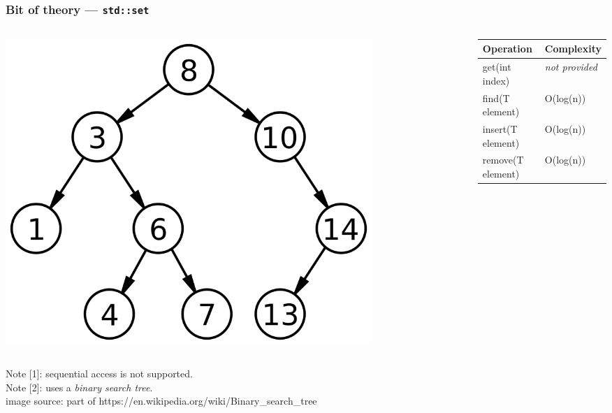 \documentclass[aspectratio=169]{beamer}
\newcommand{\greenemph}[1]{\textit{\textcolor{clGreen}{#1}}}
\newcommand{\cpp}[1]{\texttt{\textbf{\textcolor{clCodeBlue}{#1}}}}
\newcommand\fontV{\fontsize{5}{5}\selectfont}
\newcommand\addsource[1]{\fontV\textcolor{clGray}{#1}}
\begin{document}
\begin{frame}
\frametitle{Bit of theory --- \cpp{std::set}}
\begin{columns}
  \begin{column}{0.38\textwidth}
    \includegraphics[width=0.8\textwidth]{pictures/bst.png} \\
  \end{column}\hfill%
  \begin{column}{0.58\textwidth}
    \begin{tabular}{|l|l|}
      \hline
      Operation & Complexity \\
      \hline\hline
      get(int index) & \emph{not provided} \\
      \hline
      find(T element) & O(log(n)) \\
      \hline
      insert(T element) & O(log(n)) \\
      \hline
      remove(T element) & O(log(n)) \\
      \hline
    \end{tabular} \\
  \end{column}
\end{columns}
\vspace*{12pt}
{\hspace{3cm} Note [1]: sequential access is not supported.\\}
{\hspace{3cm} Note [2]: uses a \greenemph{binary search tree}.\\}
\vspace*{12pt}
\addsource{image source: part of https://en.wikipedia.org/wiki/Binary\_search\_tree}
\end{frame}
\end{document}
